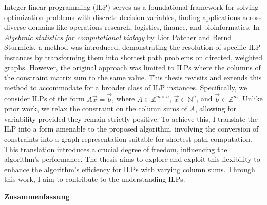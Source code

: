 \documentclass{report}
\theoremstyle{definition}
\begin{document}
Integer linear programming (ILP) serves as a foundational framework for solving optimization problems with discrete decision variables, finding applications across diverse domains like operations research, logistics, finance, and bioinformatics. In \textit{Algebraic statistics for computational biology} by Lior Patcher and Bernd Sturmfels, a method was introduced, demonstrating the resolution of specific ILP instances by transforming them into shortest path problems on directed, weighted graphs. However, the original approach was limited to ILPs where the columns of the constraint matrix sum to the same value. This thesis revisits and extends this method to accommodate for a broader class of ILP instances. Specifically, we consider ILPs of the form $A\vec x = \vec b$, where $A\in \mathbb{Z}^{m \times n}$, $\vec x \in \mathbb{N}^n$, and $\vec b \in \mathbb{Z}^m$. Unlike prior work, we relax the constraint on the column sums of $A$, allowing for variability provided they remain strictly positive. To achieve this, I translate the ILP into a form amenable to the proposed algorithm, involving the conversion of constraints into a graph representation suitable for shortest path computation. This translation introduces a crucial degree of freedom, influencing the algorithm's performance. The thesis aims to explore and exploit this flexibility to enhance the algorithm's  efficiency for ILPs with varying column sums. Through this work, I aim to contribute to the understanding ILPs.
\vspace{1.5cm}
\begin{center}
  \Large\textbf{Zusammenfassung}
\end{center}
\end{document}
